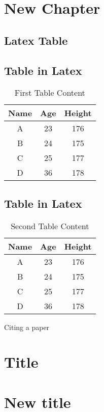 \documentclass[a4paper,12pt]{report}
\begin{document}
\chapter{New Chapter}
\section{Latex Table}

\newpage

\section{Table in Latex}

\begin{table}[h]
	\centering
	\caption{First Table Content}
\begin{tabular}{|c|c|c|}
	\hline
	Name & Age & Height\\ \hline
	A  & 23 & 176 \\ \hline
	B  & 24 & 175 \\ \hline
	C  & 25 & 177\\ \hline
	D  & 36 & 178 \\ \hline
\end{tabular}
\end{table}

\newpage

\section{Table in Latex}
\begin{table}[h]
	\centering
	\caption{Second Table Content}
\begin{tabular}{|c|c|c|}
	\hline
	Name & Age & Height\\ \hline
	A  & 23 & 176 \\ \hline
	B  & 24 & 175 \\ \hline
	C  & 25 & 177\\ \hline
	D  & 36 & 178 \\ \hline
\end{tabular}

\end{table}
Citing a paper \cite{fenton2001fault}


\begin{appendices}
	\chapter{Title}
	\chapter{New title}
	\end{appendices}



\end{document}
